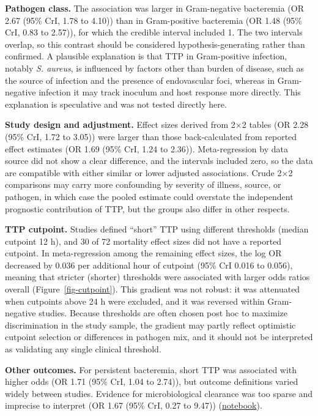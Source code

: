 \documentclass[
  11pt,
]{article}
\begin{document}
\textbf{Pathogen class.} The association was larger in Gram-negative
bacteremia (OR 2.67 (95\% CrI, 1.78 to 4.10)) than in Gram-positive
bacteremia (OR 1.48 (95\% CrI, 0.83 to 2.57)), for which the credible
interval included 1. The two intervals overlap, so this contrast should
be considered hypothesis-generating rather than confirmed. A plausible
explanation is that TTP in Gram-positive infection, notably \emph{S.
aureus}, is influenced by factors other than burden of disease, such as
the source of infection and the presence of endovascular foci, whereas
in Gram-negative infection it may track inoculum and host response more
directly. This explanation is speculative and was not tested directly
here.

\textbf{Study design and adjustment.} Effect sizes derived from 2×2
tables (OR 2.28 (95\% CrI, 1.72 to 3.05)) were larger than those
back-calculated from reported effect estimates (OR 1.69 (95\% CrI, 1.24
to 2.36)). Meta-regression by data source did not show a clear
difference, and the intervals included zero, so the data are compatible
with either similar or lower adjusted associations. Crude 2×2
comparisons may carry more confounding by severity of illness, source,
or pathogen, in which case the pooled estimate could overstate the
independent prognostic contribution of TTP, but the groups also differ
in other respects.

\textbf{TTP cutpoint.} Studies defined ``short'' TTP using different
thresholds (median cutpoint 12 h), and 30 of 72 mortality effect sizes
did not have a reported cutpoint. In meta-regression among the remaining
effect sizes, the log OR decreased by 0.036 per additional hour of
cutpoint (95\% CrI 0.016 to 0.056), meaning that stricter (shorter)
thresholds were associated with larger odds ratios overall
(Figure~\ref{fig-cutpoint}). This gradient was not robust: it was
attenuated when cutpoints above 24 h were excluded, and it was reversed
within Gram-negative studies. Because thresholds are often chosen post
hoc to maximize discrimination in the study sample, the gradient may
partly reflect optimistic cutpoint selection or differences in pathogen
mix, and it should not be interpreted as validating any single clinical
threshold.

\textbf{Other outcomes.} For persistent bacteremia, short TTP was
associated with higher odds (OR 1.71 (95\% CrI, 1.04 to 2.74)), but
outcome definitions varied widely between studies. Evidence for
microbiological clearance was too sparse and imprecise to interpret (OR
1.67 (95\% CrI, 0.27 to 9.47))
(\href{notebooks/clinical_failure.qmd}{notebook}).
\end{document}
